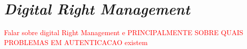 \section{\emph{Digital Right Management}}
\textcolor{red}{ Falar sobre digital Right Management e PRINCIPALMENTE SOBRE QUAIS PROBLEMAS EM AUTENTICACAO existem}